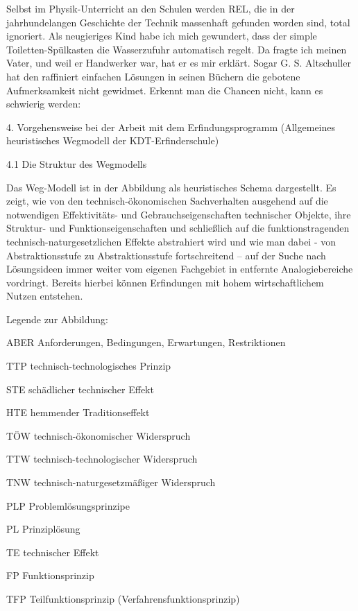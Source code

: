 \documentclass[12pt,a4paper]{article}
\begin{document}
Selbst im Physik-Unterricht an den Schulen werden REL, die in der jahrhundelangen Geschichte der Technik massenhaft gefunden worden sind, total ignoriert. Als neugieriges Kind habe ich mich gewundert, dass der simple Toiletten-Spülkasten die Wasserzufuhr automatisch regelt. Da fragte ich meinen Vater, und weil er Handwerker war, hat er es mir erklärt. Sogar G. S. Altschuller hat den raffiniert einfachen Lösungen in seinen Büchern die gebotene Aufmerksamkeit nicht gewidmet. Erkennt man die Chancen nicht, kann es schwierig werden:

4.  Vorgehensweise bei der Arbeit mit dem Erfindungsprogramm (Allgemeines heuristisches Wegmodell der KDT-Erfinderschule)

4.1  Die Struktur des Wegmodells

Das Weg-Modell ist in der Abbildung als heuristisches Schema dargestellt. Es zeigt, wie von den technisch-ökonomischen Sachverhalten ausgehend auf die notwendigen Effektivitäts- und Gebrauchseigenschaften technischer Objekte, ihre Struktur- und Funktionseigenschaften und schließlich auf die funktionstragenden technisch-naturgesetzlichen Effekte abstrahiert wird und wie man dabei - von Abstraktionsstufe zu Abstraktionsstufe fortschreitend – auf der Suche nach Lösungsideen immer weiter vom eigenen Fachgebiet in entfernte Analogiebereiche vordringt. Bereits hierbei können Erfindungen mit hohem wirtschaftlichem Nutzen entstehen.



Legende zur Abbildung:


ABER       Anforderungen, Bedingungen, Erwartungen, Restriktionen

TTP          technisch-technologisches Prinzip

STE          schädlicher technischer Effekt

HTE          hemmender Traditionseffekt

TÖW         technisch-ökonomischer Widerspruch

TTW          technisch-technologischer Widerspruch

TNW          technisch-naturgesetzmäßiger Widerspruch

PLP           Problemlösungsprinzipe

PL              Prinziplösung

TE              technischer Effekt

FP              Funktionsprinzip

TFP            Teilfunktionsprinzip (Verfahrensfunktionsprinzip)
\end{document}

